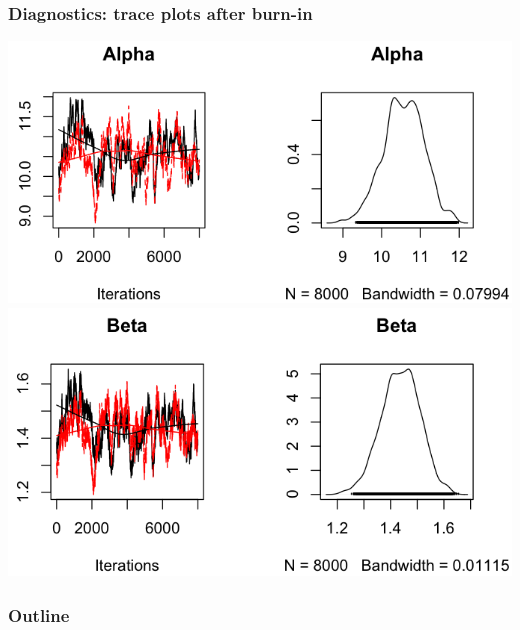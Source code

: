 \documentclass[handout]{beamer}
\numberwithin{equation}{section}
\begin{document}
\begin{frame}
\frametitle{Diagnostics: trace plots after burn-in}
\begin{center}
\includegraphics[scale=.3]{../../fig/mcmc-trace-alpha.png} \\
\includegraphics[scale=.3]{../../fig/mcmc-trace-beta.png}
\end{center}
\end{frame}


\begin{frame}
\frametitle{Outline}
\tableofcontents
\end{frame}
\end{document}
